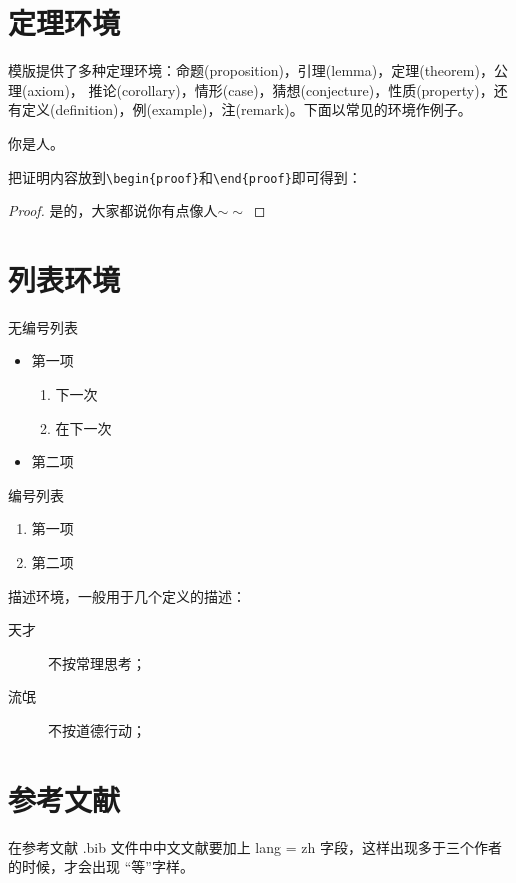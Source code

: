 \section{定理环境}
模版提供了多种定理环境：命题(proposition)，引理(lemma)，定理(theorem)，公理(axiom)， 推论(corollary)，情形(case)，猜想(conjecture)，性质(property)，还有定义(definition)，例(example)，注(remark)。下面以常见的环境作例子。\cite{Barman2006,Berry2007,Boutsidis2008,Buciu2006,Cai2005,Chen2008,Cichocki2006,Cichocki2008,Cichocki2007,Cichocki2007a,Cichocki}
\begin{theorem}[人论]\label{thm:ex1}
你是人。
\end{theorem}
把证明内容放到\verb|\begin{proof}|和\verb|\end{proof}|即可得到：
\begin{proof}
是的，大家都说你有点像人$\sim\sim$
\end{proof}

\section{列表环境}
无编号列表
\begin{itemize}
\item 第一项
	\begin{enumerate}
	\item 下一次
	\item 在下一次
	\end{enumerate}
\item 第二项
\end{itemize}

编号列表
\begin{enumerate}
\item 第一项
\item 第二项
\end{enumerate}

描述环境，一般用于几个定义的描述：
\begin{description}
  \item[天才] 不按常理思考；
  \item[流氓] 不按道德行动；
\end{description}

\section{参考文献}

在参考文献 .bib 文件中中文文献要加上 lang = {zh} 
字段，这样出现多于三个作者的时候，才会出现 “等”字样。


